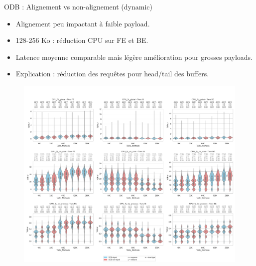 \documentclass[aspectratio=43,8pt]{beamer}
\begin{document}
\begin{frame}{ODB : Alignement vs non-alignement (dynamic)}
\begin{itemize}
    \item Alignement peu impactant à faible payload.
    \item 128-256 Ko : réduction CPU sur FE et BE.
    \item Latence moyenne comparable mais légère amélioration pour grosses payloads.
    \item Explication : réduction des requêtes pour head/tail des buffers.
\end{itemize}
\begin{figure}
    \includegraphics[width=\textwidth]{results/results-cmp/odb_aligned_vs_unaligned_dynamic.png}
\end{figure}
\end{frame}
\end{document}
